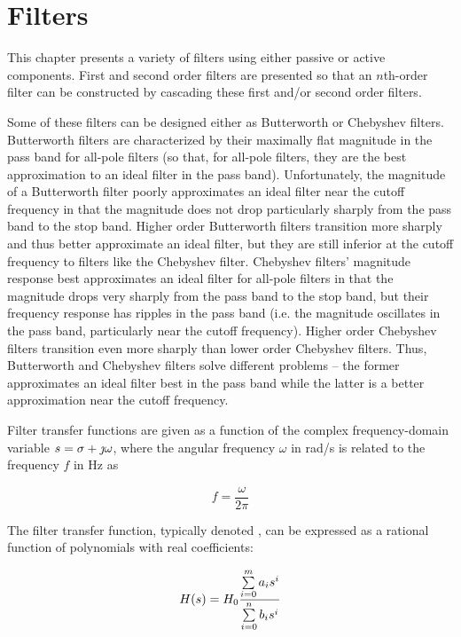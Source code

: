 \chapter{Filters}
This chapter presents a variety of filters using either passive or active components.
First and second order filters are presented so that an $n$th-order filter can be constructed by cascading these first and/or second order filters.

Some of these filters can be designed either as Butterworth or Chebyshev filters.
Butterworth filters are characterized by their maximally flat magnitude in the pass band for all-pole filters (so that, for all-pole filters, they are the best approximation to an ideal filter in the pass band).
Unfortunately, the magnitude of a Butterworth filter poorly approximates an ideal filter near the cutoff frequency in that the magnitude does not drop particularly sharply from the pass band to the stop band.
Higher order Butterworth filters transition more sharply and thus better approximate an ideal filter, but they are still inferior at the cutoff frequency to filters like the Chebyshev filter.
Chebyshev filters' magnitude response best approximates an ideal filter for all-pole filters in that the magnitude drops very sharply from the pass band to the stop band, but their frequency response has ripples in the pass band (i.e. the magnitude oscillates in the pass band, particularly near the cutoff frequency).
Higher order Chebyshev filters transition even more sharply than lower order Chebyshev filters.
Thus, Butterworth and Chebyshev filters solve different problems -- the former approximates an ideal filter best in the pass band while the latter is a better approximation near the cutoff frequency. \autocite[107, 111]{op-amp-circuits-johnson}

Filter transfer functions are given as a function of the complex frequency-domain variable \(s = \sigma + \jomega\), where the angular frequency \(\omega\) in \si{\radian/\second} is related to the frequency \(f\) in \si{\Hz} as

\begin{equation}
	f = \frac{\omega}{2\pi}
	\label{eq:omega_to_f}
\end{equation}

The filter transfer function, typically denoted \Hs, can be expressed as a rational function of polynomials with real coefficients:

\begin{equation}
	H(s) = H_0\frac{\sum\limits_{i=0}^{m} a_i s^i}{\sum\limits_{i=0}^n b_i s^i}
	\label{eq:general_filter_TF}
\end{equation}

